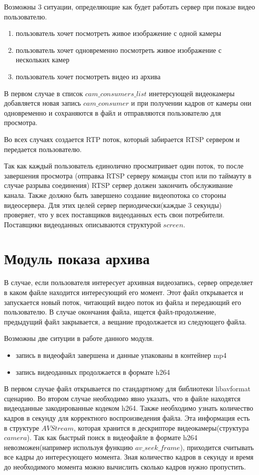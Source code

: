 Возможны 3 ситуации, определяющие как будет работать сервер при показе видео пользователю.
\begin{enumerate}
	\item пользователь хочет посмотреть живое изображение с одной камеры
	\item пользователь хочет одновременно посмотреть живое изображение с нескольких камер
	\item пользователь хочет посмотреть видео из архива
\end{enumerate}

В первом случае в список $cam\_consumers\_list$ инетерсующей видеокамеры добавляется новая запись
$cam\_consumer$ и при получении кадров от камеры они одновременно и сохраняются в файл и отправляются
пользователю для просмотра.

Во всех случаях создается RTP поток, который забирается RTSP сервером и передается пользователю.

Так как каждый пользователь единолично просматривает один поток, то после завершения просмотра
(отправка RTSP серверу команды стоп или по таймауту в случае разрыва соединения) RTSP сервер
должен закончить обслуживание канала. Также должно быть завершено создание видеопотока со стороны видеосервера.
Для этих целей сервер периодически(каждые 3 секунды) проверяет, что у всех поставщиков
видеоданных есть свои потребители. Поставщики видеоданных описываются структурой $screen$.

\section{Модуль показа архива}
В случае, если пользователя интересует архивная видеозапись, сервер определяет в каком файле
находится интересующий его момент. Этот файл открывается и запускается новый поток, читающий видео
поток из файла и передающий его пользователю. В случае окончания файла, ищется файл-продолжение,
предыдущий файл закрывается, а вещание продолжается из следующего файла.

Возможны две ситуции в работе данного модуля.

\begin{itemize}
 \item запись в видеофайл завершена и данные упакованы в контейнер mp4
 \item запись видеоданных продолжается в формате h264
\end{itemize}

В первом случае файл открывается по стандартному для библиотеки libavformat сценарию.
Во втором случае необходимо явно указать, что в файле находятся видеоданные закодированные
кодеком h264. Также необходимо узнать количество кадров в секунду для корректного
воспроизведения файла. Эта информация есть в структуре $AVStream$, которая хранится
в дескрипторе видеокамеры(структура $camera$). Так как быстрый поиск в видеофайле в формате h264
невозможен(например используя функцию $av\_seek\_frame$), приходится считывать все кадры до
интересующего момента. Зная количество кадров в секунду и время до необходимого момента можно
вычислить сколько кадров нужно пропустить.

